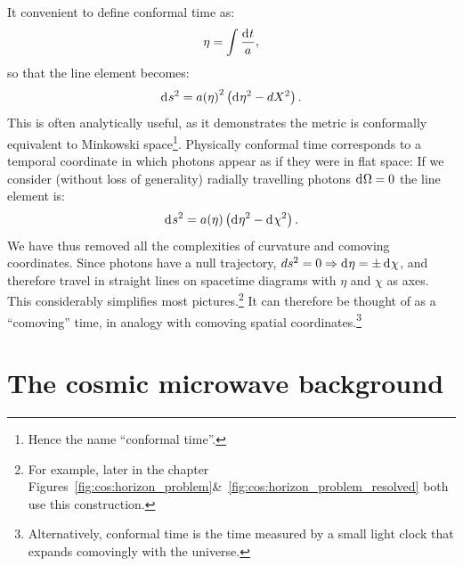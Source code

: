 It convenient to define conformal time as:
\begin{equation}
  \eta = \int \frac{\operatorname{d}^{}\!{t}}{a},
  \label{eqn:cos:conformal_time}
\end{equation}
so that the line element becomes:
\begin{equation}          
  \operatorname{d}^{}\!{s}^2 = {a(\eta)}^2\left( \operatorname{d}^{}\!{\eta}^2 - d{X}^2 \right).
  \label{eqn:cos:flat_FRW}
\end{equation}
This is often analytically useful, as it demonstrates the metric is conformally equivalent to Minkowski space\footnote{Hence the name ``conformal time''.}. Physically conformal time corresponds to a temporal coordinate in which photons appear as if they were in flat space: If we consider (without loss of generality) radially travelling photons $\operatorname{d}^{}\!{\Omega}=0$ the line element is:
\begin{equation}          
  \operatorname{d}^{}\!{s}^2 = a(\eta)\left( \operatorname{d}^{}\!{\eta}^2 - \operatorname{d}^{}\!{\chi}^2 \right).
  \label{eqn:cos:flat_FRW_radial}
\end{equation}
We have thus removed all the complexities of curvature and comoving coordinates. Since photons have a null trajectory, $ds^2=0\Rightarrow \operatorname{d}^{}\!{\eta} = \pm \operatorname{d}^{}\!{\chi}$, and therefore  travel in straight lines on spacetime diagrams with $\eta$ and $\chi$ as axes. This considerably simplifies most pictures.\footnote{For example, later in the chapter Figures~\protect\ref{fig:cos:horizon_problem}\&~\protect\ref{fig:cos:horizon_problem_resolved} both use this construction.}  It can therefore be thought of as a ``comoving'' time, in analogy with comoving spatial coordinates.\footnote{Alternatively, conformal time is the time measured by a small light clock that expands comovingly with the universe.}

\section{The cosmic microwave background}

